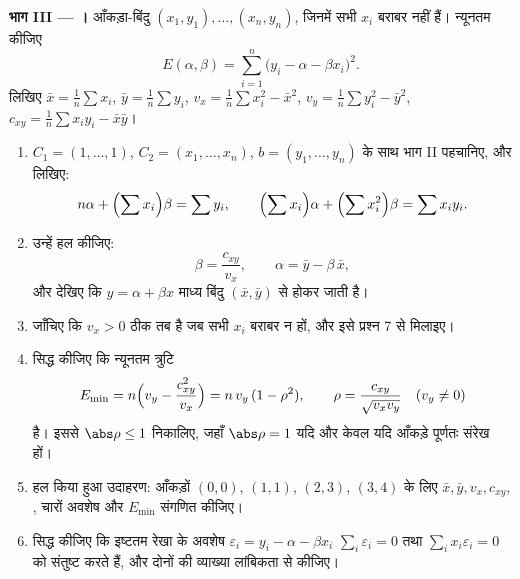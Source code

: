 \begin{problem}
\medskip
\noindent\textbf{भाग III --- ।} आँकड़ा-बिंदु $(x_1, y_1),
\dots, (x_n, y_n)$, जिनमें सभी $x_i$ बराबर नहीं हैं। न्यूनतम कीजिए
\[
E(\alpha, \beta) = \sum_{i=1}^{n}\bigl(y_i - \alpha - \beta
x_i\bigr)^2 .
\]
लिखिए $\bar x = \frac1n\sum x_i$, $\bar y = \frac1n\sum y_i$,
$v_x = \frac1n\sum x_i^2 - \bar x^2$, $v_y = \frac1n\sum y_i^2 -
\bar y^2$, $c_{xy} = \frac1n\sum x_i y_i - \bar x\bar y$।
\begin{enumerate}[resume]
  \item $C_1 = (1, \dots, 1)$, $C_2 = (x_1, \dots, x_n)$, $b = (y_1,
        \dots, y_n)$ के साथ भाग II पहचानिए, और 
        लिखिए:
        \[
        n\alpha + \Bigl(\sum x_i\Bigr)\beta = \sum y_i,
        \qquad
        \Bigl(\sum x_i\Bigr)\alpha + \Bigl(\sum
        x_i^2\Bigr)\beta = \sum x_i y_i .
        \]
  \item उन्हें हल कीजिए:
        \[
        \beta = \frac{c_{xy}}{v_x},
        \qquad
        \alpha = \bar y - \beta\,\bar x ,
        \]
        और देखिए कि \emph{} $y = \alpha + \beta x$ माध्य
        बिंदु $(\bar x, \bar y)$ से होकर जाती है।
  \item जाँचिए कि $v_x > 0$ ठीक तब है जब सभी $x_i$ बराबर न हों, और इसे
        प्रश्न 7 से मिलाइए।
  \item सिद्ध कीजिए कि न्यूनतम त्रुटि
        \[
        E_{\min} = n\Bigl(v_y - \frac{c_{xy}^2}{v_x}\Bigr)
        = n\,v_y\,(1 - \rho^2),
        \qquad
        \rho = \frac{c_{xy}}{\sqrt{v_x v_y}}
        \quad (v_y \neq 0)
        \]
        है। इससे $\abs\rho \leq 1$ निकालिए, जहाँ $\abs\rho = 1$ यदि और
        केवल यदि आँकड़े पूर्णतः संरेख हों।
  \item हल किया हुआ उदाहरण: आँकड़ों $(0,0)$, $(1,1)$, $(2,3)$, $(3,4)$
        के लिए $\bar x, \bar y, v_x, c_{xy}$, , चारों
        अवशेष और $E_{\min}$ संगणित कीजिए।
  \item सिद्ध कीजिए कि इष्टतम रेखा के अवशेष $\varepsilon_i = y_i -
        \alpha - \beta x_i$ $\sum_i \varepsilon_i = 0$ तथा $\sum_i
        x_i\varepsilon_i = 0$ को संतुष्ट करते हैं, और दोनों की व्याख्या
        लांबिकता से कीजिए।
\end{enumerate}


\end{problem}
